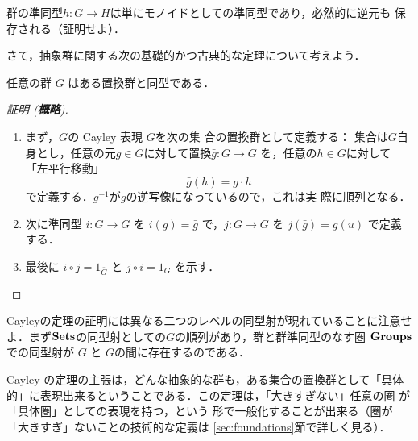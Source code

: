 群の準同型$h:G \to H$は単にモノイドとしての準同型であり，必然的に逆元も
保存される（証明せよ）．

さて，抽象群に関する次の基礎的かつ古典的な定理について考えよう．

\begin{theorem*}[Cayley]
 任意の群 $G$ はある置換群と同型である．
\end{theorem*}
\begin{proof}[証明 \textup({\bfseries 概略}\textup)]
 　
 \begin{enumerate}
  \item まず，$G$の Cayley 表現 $\bar G$を次の集
	合の置換群として定義する：
	集合は$G$自身とし，任意の元$g \in G$に対して置換$\bar g :  G \to G$
	を，任意の$h\in G$に対して「左平行移動」
	\[
	\bar g(h) = g \cdot h
	\]
	で定義する．$\bar{g^{-1}}$が$\bar g$の逆写像になっているので，これは実
	際に順列となる．
  \item 次に準同型 $i: G \to \bar G$ を $i(g) = \bar g$ で，$j: \bar G
	\to G$ を $j(\bar g) = g(u)$ で定義する．
  \item 最後に $i \circ j = 1_{\bar G}$ と $j \circ i = 1_G$ を示す．
 \end{enumerate}
\end{proof}
\begin{warn}
 Cayleyの定理の証明には異なる二つのレベルの同型射が現れていることに注意せ
 よ．まず$\mathbf{Sets}$の同型射としての$G$の順列があり，群と群準同型のなす圏
 ${\bf Groups}$での同型射が $G$ と $\bar G$の間に存在するのである．
\end{warn}
Cayley の定理の主張は，どんな抽象的な群も，ある集合の置換群として「具体
的」に表現出来るということである．この定理は，「大きすぎない」任意の圏
が「具体圏」としての表現を持つ，という
形で一般化することが出来る（圏が「大きすぎ」ないことの技術的な定義は
\ref{sec:foundations}節で詳しく見る）．

